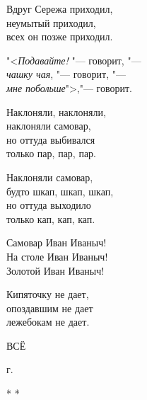 {    \hspace{1cm}
    \parbox{6cm}{Вдруг Сережа приходил, \\
    неумытый приходил, \\
    всех он позже приходил. }

    \vspace{0.5cm}

    \parbox{6cm}{"<\textit{Подавайте!} "--- говорит, "--- \\
    \textit{чашку чая}, "--- говорит, "--- \\
    \textit{мне побольше}">,"--- говорит. }

    \vspace{0.5cm}

    \hspace{1cm}
    \parbox{6cm}{Наклоняли, наклоняли, \\
    наклоняли самовар, \\
    но оттуда выбивался \\
    только пар, пар, пар. }

    \vspace{0.5cm}

    \parbox{6cm}{Наклоняли самовар, \\
    будто шкап, шкап, шкап, \\
    но оттуда выходило \\
    только кап, кап, кап. } 

    \vspace{0.5cm}

    \hspace{1cm}
    \parbox{6cm}{Самовар Иван Иваныч! \\
    На столе Иван Иваныч! \\
    Золотой Иван Иваныч! }

    \vspace{0.5cm}

    \parbox{6cm}{Кипяточку не дает, \\
    опоздавшим не дает \\
    лежебокам не дает. 

    \vspace{0.5cm}
    
    \centering ВСЁ

     г.

    \vspace{0.5cm}

    \centering * * *
    }

}